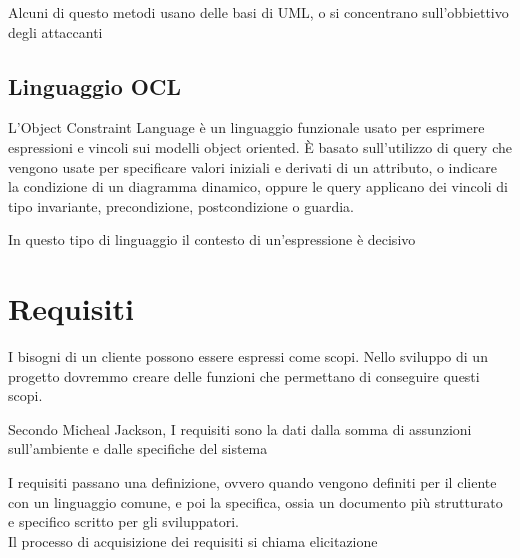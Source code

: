 \documentclass[12pt, a4paper]{article}
\begin{document}
Alcuni di questo metodi usano delle basi di UML, o si concentrano sull'obbiettivo degli attaccanti

\subsection{Linguaggio OCL}
L'Object Constraint Language è un linguaggio funzionale usato per esprimere espressioni e vincoli sui modelli object
oriented. È basato sull'utilizzo di query che vengono usate per specificare valori iniziali e derivati di un 
attributo, o indicare la condizione di un diagramma dinamico, oppure le query applicano dei vincoli di tipo
invariante, precondizione, postcondizione o guardia.

In questo tipo di linguaggio il contesto di un'espressione è decisivo

\newpage
\section{Requisiti}
I bisogni di un cliente possono essere espressi come scopi. Nello sviluppo di un progetto dovremmo creare delle 
funzioni che permettano di conseguire questi scopi.

Secondo Micheal Jackson, I requisiti sono la dati dalla somma di assunzioni sull'ambiente e dalle specifiche del 
sistema

I requisiti passano una definizione, ovvero quando vengono definiti per il cliente con un linguaggio comune, e
poi la specifica, ossia un documento più strutturato e specifico scritto per gli sviluppatori.\\ Il processo 
di acquisizione dei requisiti si chiama elicitazione
\end{document}
